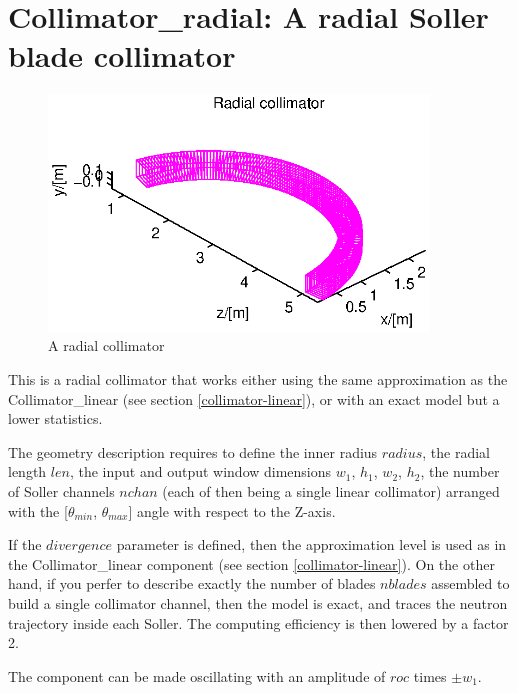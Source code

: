 \section{Collimator\_radial: A radial Soller blade collimator}


\begin{figure}
  \begin{center}
    \includegraphics[width=0.9\textwidth]{figures/radial.eps}
  \end{center}
\caption{A radial collimator}
\label{f:coll-radial}
\end{figure}

This is a radial collimator that works either using the same approximation as the Collimator\_linear (see section \ref{collimator-linear}), or with an exact model but a lower statistics.

The geometry description requires to define the inner radius $radius$, the radial length $len$, the input and output window dimensions $w_1$, $h_1$, $w_2$, $h_2$, the number of Soller channels $nchan$ (each of then being a single linear collimator) arranged with the [$\theta_{min}$, $\theta_{max}$] angle with respect to the Z-axis.

If the $divergence$ parameter is defined, then the approximation level is used as in the Collimator\_linear component (see section \ref{collimator-linear}). On the other hand, if you perfer to describe exactly the number of blades $nblades$ assembled to build a single collimator channel, then the model is exact, and traces the neutron trajectory inside each Soller. The computing efficiency is then lowered by a factor 2.

The component can be made oscillating with an amplitude of $roc$ times $\pm w_1$.

